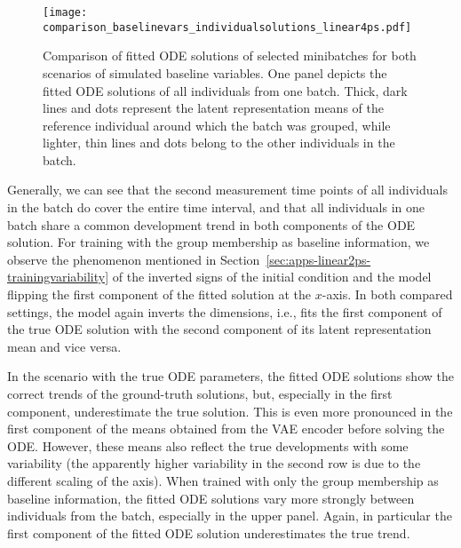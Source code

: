 \begin{figure}
	\texttt{[image: comparison\_baselinevars\_individualsolutions\_linear4ps.pdf]}
	\caption{Comparison of fitted ODE solutions of selected minibatches for both scenarios of simulated baseline variables. One panel depicts the fitted ODE solutions of all individuals from one batch. Thick, dark lines and dots represent the latent representation means of the reference individual around which the batch was grouped, while lighter, thin lines and dots belong to the other individuals in the batch.}
	\label{fig:apps-comparison_tp_gi_individualbatches_linear4ps}
\end{figure}
Generally, we can see that the second measurement time points of all individuals in the batch do cover the entire time interval, and that all individuals in one batch share a common development trend in both components of the ODE solution.
For training with the group membership as baseline information, we observe the phenomenon mentioned in Section~\ref{sec:apps-linear2ps-trainingvariability} of the inverted signs of the initial condition and the model flipping the first component of the fitted solution at the $x$-axis. In both compared settings, the model again inverts the dimensions, i.e., fits the first component of the true ODE solution with the second component of its latent representation mean and vice versa. 

In the scenario with the true ODE parameters, the fitted ODE solutions show the correct trends of the ground-truth solutions, but, especially in the first component, underestimate the true solution. This is even more pronounced in the first component of the means obtained from the VAE encoder before solving the ODE. However, these means also reflect the true developments with some variability (the apparently higher variability in the second row is due to the different scaling of the axis). When trained with only the group membership as baseline information, the fitted ODE solutions vary more strongly between individuals from the batch, especially in the upper panel. Again, in particular the first component of the fitted ODE solution underestimates the true trend.

